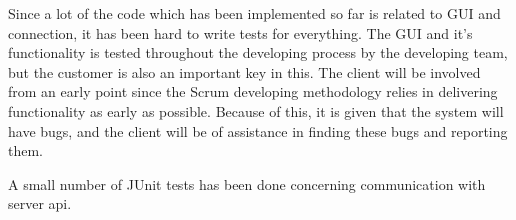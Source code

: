 Since a lot of the code which has been implemented so far is related to GUI and connection, it has been hard to write tests for everything.
The GUI and it's functionality is tested throughout the developing process by the developing team, but the customer is also an important key in this. 
The client will be involved from an early point since the Scrum developing methodology relies in delivering functionality as early as possible. Because of this, it is given that the system will have bugs, and the client will be of assistance in finding these bugs and reporting them. 

A small number of JUnit tests has been done concerning communication with server api.

\FloatBarrier